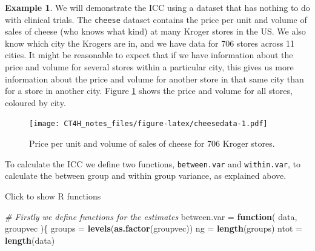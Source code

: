 \documentclass[
  openany]{book}
\newenvironment{Shaded}{\begin{snugshade}}{\end{snugshade}}
\newcommand{\AttributeTok}[1]{\textcolor[rgb]{0.13,0.29,0.53}{#1}}
\newcommand{\CommentTok}[1]{\textcolor[rgb]{0.56,0.35,0.01}{\textit{#1}}}
\newcommand{\ControlFlowTok}[1]{\textcolor[rgb]{0.13,0.29,0.53}{\textbf{#1}}}
\newcommand{\FunctionTok}[1]{\textcolor[rgb]{0.13,0.29,0.53}{\textbf{#1}}}
\newcommand{\NormalTok}[1]{#1}
\newcommand{\OtherTok}[1]{\textcolor[rgb]{0.56,0.35,0.01}{#1}}
\newcommand{\SpecialCharTok}[1]{\textcolor[rgb]{0.81,0.36,0.00}{\textbf{#1}}}
\newcommand{\StringTok}[1]{\textcolor[rgb]{0.31,0.60,0.02}{#1}}
\theoremstyle{definition}
\theoremstyle{definition}
\newtheorem{example}{Example}[chapter]
\theoremstyle{definition}
\theoremstyle{definition}
\theoremstyle{remark}
\begin{document}
\begin{example}
\protect\hypertarget{exm:kroger}{}\label{exm:kroger}We will demonstrate the ICC using a dataset that has nothing to do with clinical trials. The \texttt{cheese} dataset contains the price per unit and volume of sales of cheese (who knows what kind) at many Kroger stores in the US. We also know which city the Krogers are in, and we have data for 706 stores across 11 cities. It might be reasonable to expect that if we have information about the price and volume for several stores within a particular city, this gives us more information about the price and volume for another store in that same city than for a store in another city. Figure \ref{fig:cheesedata} shows the price and volume for all stores, coloured by city.

\begin{Shaded}
\end{Shaded}

\begin{figure}
\centering
\texttt{[image: CT4H\_notes\_files/figure-latex/cheesedata-1.pdf]}
\caption{\label{fig:cheesedata}Price per unit and volume of sales of cheese for 706 Kroger stores.}
\end{figure}

To calculate the ICC we define two functions, \texttt{between.var} and \texttt{within.var}, to calculate the between group and within group variance, as explained above.

Click to show R functions

\begin{Shaded}
\begin{Highlighting}[]
\CommentTok{\# Firstly we define functions for the estimates}
\NormalTok{between.var }\OtherTok{=} \ControlFlowTok{function}\NormalTok{(}
\NormalTok{    data,}
\NormalTok{    groupvec}
\NormalTok{)\{}
\NormalTok{  groups }\OtherTok{=} \FunctionTok{levels}\NormalTok{(}\FunctionTok{as.factor}\NormalTok{(groupvec))}
\NormalTok{  ng }\OtherTok{=} \FunctionTok{length}\NormalTok{(groups)}
\NormalTok{  ntot }\OtherTok{=} \FunctionTok{length}\NormalTok{(data)}
  

\end{Highlighting}
\end{Shaded}
\end{example}
\end{document}
